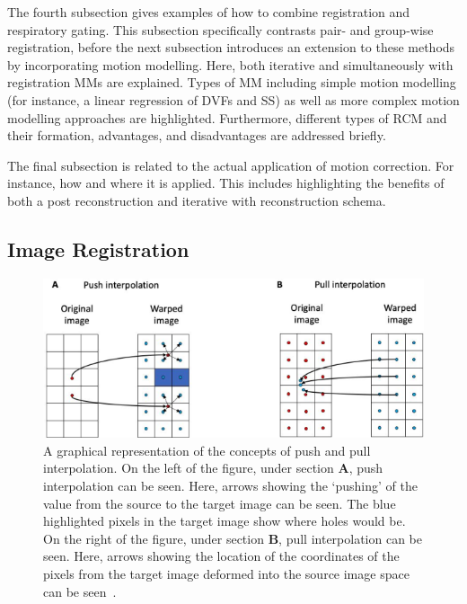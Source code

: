         The fourth subsection gives examples of how to combine registration and respiratory gating. This subsection specifically contrasts pair- and group-wise registration, before the next subsection introduces an extension to these methods by incorporating motion modelling. Here, both iterative and simultaneously with registration \glspl{MM} are explained. Types of \gls{MM} including simple motion modelling (for instance, a linear regression of \glspl{DVF} and \gls{SS}) as well as more complex motion modelling approaches are highlighted. Furthermore, different types of \gls{RCM} and their formation, advantages, and disadvantages are addressed briefly.
        
        The final subsection is related to the actual application of motion correction. For instance, how and where it is applied. This includes highlighting the benefits of both a post reconstruction and iterative with reconstruction schema.
    
        \subsection{Image Registration} \label{sec:image_registration}
            \begin{figure}
                \centering
                
                \includegraphics[width=1.0\linewidth]{figures/background_push_pull_interpolation.png}
                
                \captionsetup{singlelinecheck=false}
                \caption{
                    A graphical representation of the concepts of push and pull interpolation. On the left of the figure, under section \textbf{A}, push interpolation can be seen. Here, arrows showing the `pushing' of the value from the source to the target image can be seen. The blue highlighted pixels in the target image show where holes would be. On the right of the figure, under section \textbf{B}, pull interpolation can be seen. Here, arrows showing the location of the coordinates of the pixels from the target image deformed into the source image space can be seen~\parencite{Akintonde2021SurrogateData}.
                }
                \label{fig:image_registration_push_pull_interpolation}
            \end{figure}

